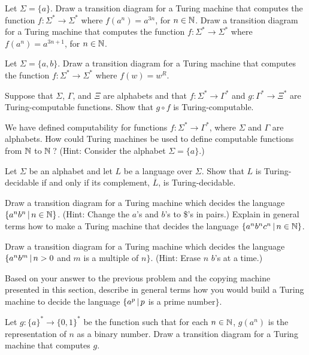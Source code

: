 \begin{exercises}

\problem Let $\Sigma=\{a\}$.  Draw a transition diagram for a Turing
machine that computes the function $f\colon\Sigma^*\to\Sigma^*$ where
$f(a^n)=a^{3n}$, for $n\in{\mathbb N}$. Draw a transition diagram for a Turing
machine that computes the function $f\colon\Sigma^*\to\Sigma^*$ where
$f(a^n)=a^{3n+1}$, for $n\in{\mathbb N}$.

\problem Let $\Sigma=\{a,b\}$.
Draw a transition diagram for a Turing machine that
computes the function $f\colon\Sigma^*\to\Sigma^*$ where
$f(w)=w^R$.

\problem Suppose that $\Sigma$, $\Gamma$, and $\Xi$ are alphabets and that
$f\colon\Sigma^*\to\Gamma^*$ and $g\colon\Gamma^*\to\Xi^*$ are 
Turing-computable functions.  Show that $g\circ f$ is Turing-computable.

\problem We have defined computability for functions $f\colon\Sigma^*\to\Gamma^*$,
where $\Sigma$ and $\Gamma$ are alphabets.  How could Turing machines
be used to define computable functions from ${\mathbb N}$ to ${\mathbb N}\,$?
(Hint: Consider the alphabet $\Sigma=\{a\}$.)

\problem Let $\Sigma$ be an alphabet and let $L$ be a language over $\Sigma$.
Show that $L$ is Turing-decidable if and only if its complement,
$\overline{L}$, is Turing-decidable.

\problem Draw a transition diagram for a Turing machine which
decides the language $\{a^nb^n\,|\, n\in{\mathbb N}\}$.  (Hint: Change the
$a$'s and $b$'s to \$'s in pairs.)  Explain in general terms how to
make a Turing machine that decides the language $\{a^nb^nc^n\,|\, n\in{\mathbb N}\}$.

\problem Draw a transition diagram for a Turing machine which
decides the language $\{a^nb^m\,|\, n>0$ and $m$ is a multiple of $n\}$.
(Hint: Erase $n$ $b$'s at a time.)

\problem Based on your answer to the previous problem and the copying
machine presented in this section, describe in
general terms how you would build a Turing machine to decide the
language $\{a^p\,|\, p$ is a prime number$\}$.

\problem Let $g\colon \{a\}^*\to\{0,1\}^*$ be the function such that
for each $n\in{\mathbb N}$, $g(a^n)$ is the representation of $n$ as a binary
number.  Draw a transition diagram for a Turing machine that computes $g$.



\end{exercises}


